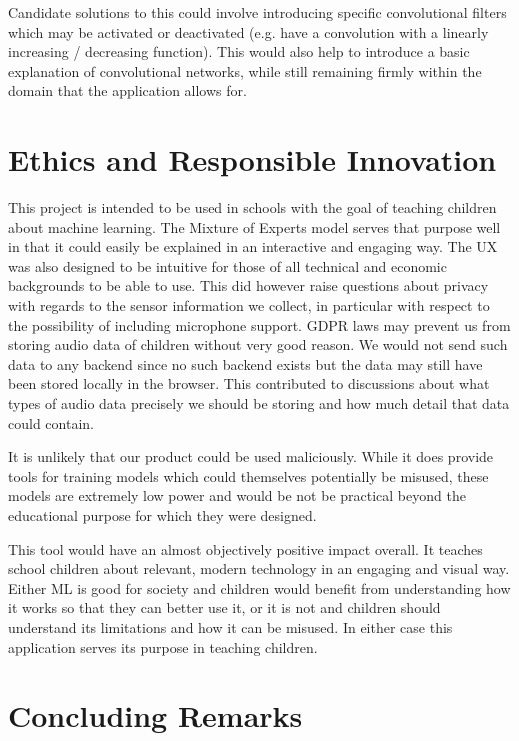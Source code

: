 \documentclass{article}
\begin{document}
Candidate solutions to this could involve introducing specific convolutional filters which may be activated or deactivated (e.g. have a convolution with a linearly increasing / decreasing function). This would also help to introduce a basic explanation of convolutional networks, while still remaining firmly within the domain that the application allows for.

\section{Ethics and Responsible Innovation}%
\label{sec:ethics}
This project is intended to be used in schools with the goal of teaching children about machine learning. The Mixture of Experts model serves that purpose well in that it could easily be explained in an interactive and engaging way. The UX was also designed to be intuitive for those of all technical and economic backgrounds to be able to use. This did however raise questions about privacy with regards to the sensor information we collect, in particular with respect to the possibility of including microphone support. GDPR laws may prevent us from storing audio data of children without very good reason. We would not send such data to any backend since no such backend exists but the data may still have been stored locally in the browser. This contributed to discussions about what types of audio data precisely we should be storing and how much detail that data could contain.

It is unlikely that our product could be used maliciously. While it does provide tools for training models which could themselves potentially be misused, these models are extremely low power and would be not be practical beyond the educational purpose for which they were designed.

This tool would have an almost objectively positive impact overall. It teaches school children about relevant, modern technology in an engaging and visual way. Either ML is good for society and children would benefit from understanding how it works so that they can better use it, or it is not and children should understand its limitations and how it can be misused. In either case this application serves its purpose in teaching children.

\section{Concluding Remarks}%
\label{sec:conclusion}
\end{document}
